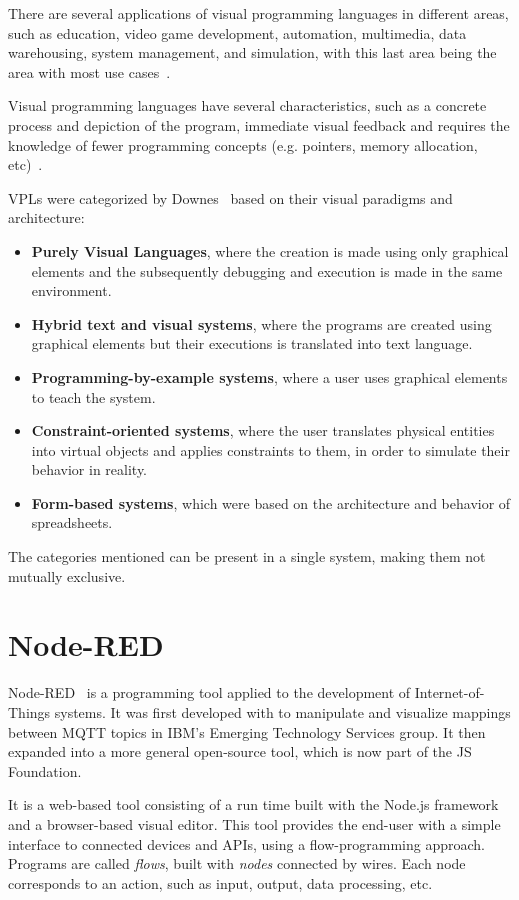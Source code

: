 There are several applications of visual programming languages in different areas, such as education, video game development, automation, multimedia, data warehousing, system management, and simulation, with this last area being the area with most use cases~\cite{survey_vpl_iot}.

Visual programming languages have several characteristics, such as a concrete process and depiction of the program, immediate visual feedback and requires the knowledge of fewer programming concepts (e.g. pointers, memory allocation, etc)~\cite{scaling_vpls}.

VPLs were categorized by Downes~\cite{vpls_survey} based on their visual paradigms and architecture: 
\begin{itemize}
    \item \textbf{Purely Visual Languages}, where the creation is made using only graphical elements and the subsequently debugging and execution is made in the same environment.
    \item \textbf{Hybrid text and visual systems}, where the programs are created using graphical elements but their executions is translated into text language.
    \item \textbf{Programming-by-example systems}, where a user uses graphical elements to teach the system.
    \item \textbf{Constraint-oriented systems}, where the user translates physical entities into virtual objects and applies constraints to them, in order to simulate their behavior in reality.
    \item \textbf{Form-based systems}, which were based on the architecture and behavior of spreadsheets.
\end{itemize}
The categories mentioned can be present in a single system, making them not mutually exclusive.

\section{Node-RED}\label{sec:node-red}

Node-RED~\cite{node_red} is a programming tool applied to the development of Internet-of-Things systems. It was first developed with to manipulate and visualize mappings between MQTT topics in IBM's Emerging Technology Services group. It then expanded into a more general open-source tool, which is now part of the JS Foundation.

It is a web-based tool consisting of a run time built with the Node.js framework and a browser-based visual editor. This tool provides the end-user with a simple interface to connected devices and APIs, using a flow-programming approach. Programs are called \emph{flows}, built with \emph{nodes} connected by wires. Each node corresponds to an action, such as input, output, data processing, etc.


